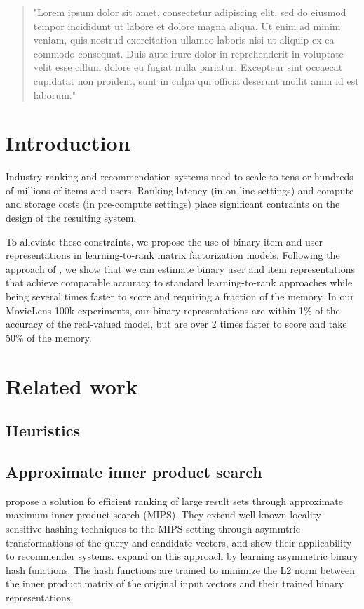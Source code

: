 \documentclass[sigconf]{acmart}
\begin{document}
\begin{abstract}
  "Lorem ipsum dolor sit amet, consectetur adipiscing elit, sed do eiusmod tempor incididunt ut labore et dolore magna aliqua. Ut enim ad minim veniam, quis nostrud exercitation ullamco laboris nisi ut aliquip ex ea commodo consequat. Duis aute irure dolor in reprehenderit in voluptate velit esse cillum dolore eu fugiat nulla pariatur. Excepteur sint occaecat cupidatat non proident, sunt in culpa qui officia deserunt mollit anim id est laborum."
\end{abstract}

\maketitle

\section{Introduction}

Industry ranking and recommendation systems need to scale to tens or hundreds of millions of items and users. Ranking latency (in on-line settings) and compute and storage costs (in pre-compute settings) place significant contraints on the design of the resulting system.

To alleviate these constraints, we propose the use of binary item and user representations in learning-to-rank matrix factorization models. Following the approach of \cite{rastegari2016xnor}, we show that we can estimate binary user and item representations that achieve comparable accuracy to standard learning-to-rank approaches while being several times faster to score and requiring a fraction of the memory. In our MovieLens 100k experiments, our binary representations are within 1\% of the accuracy of the real-valued model, but are over 2 times faster to score and take 50\% of the memory.

\section{Related work}
\subsection{Heuristics}
\subsection{Approximate inner product search}
\cite{shrivastava2014asymmetric} propose a solution fo efficient ranking of large result sets through approximate maximum inner product search (MIPS). They extend well-known \citep{indyk1998approximate} locality-sensitive hashing techniques to the MIPS setting through asymmtric transformations of the query and candidate vectors, and show their applicability to recommender systems.
\cite{Shen_2015_ICCV} expand on this approach by learning asymmetric binary hash functions. The hash functions are trained to minimize the L2 norm between the inner product matrix of the original input vectors and their trained binary representations.
\end{document}
